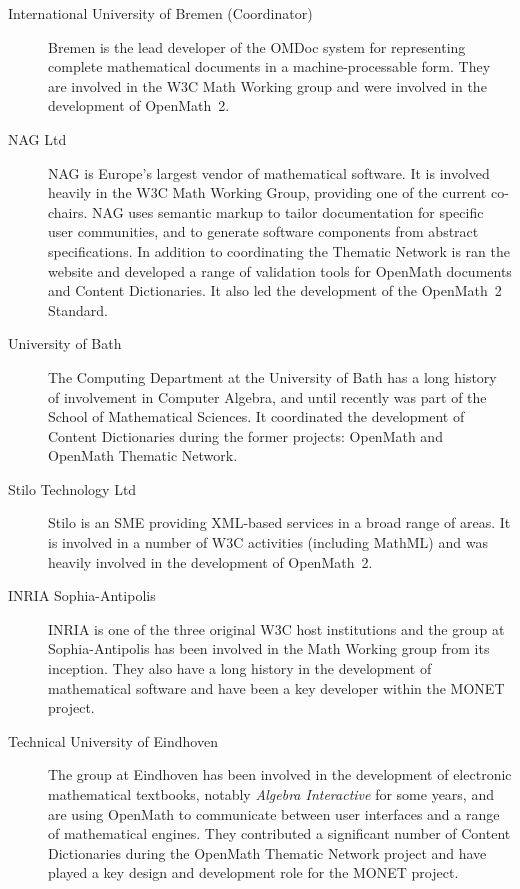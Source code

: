 \documentclass{euproposal}
\begin{document}
\begin{description}
\item[International University of Bremen (Coordinator)] Bremen is the
  lead developer of the OMDoc system for representing complete
  mathematical documents in a machine-processable form.  They are
  involved in the W3C Math Working group and were involved in the
  development of OpenMath~2.
  
\item[NAG Ltd] NAG is Europe's largest vendor of mathematical
  software.  It is involved heavily in the W3C Math Working Group,
  providing one of the current co-chairs.  NAG uses semantic markup to
  tailor documentation for specific user communities, and to generate
  software components from abstract specifications.  In addition to
  coordinating the Thematic Network is ran the website and developed a
  range of validation tools for OpenMath documents and Content
  Dictionaries.  It also led the development of the OpenMath~2
  Standard.
  
\item[University of Bath] The Computing Department at the University
  of Bath has a long history of involvement in Computer Algebra, and
  until recently was part of the School of Mathematical Sciences.  It
  coordinated the development of Content Dictionaries during the
  former projects: OpenMath and OpenMath Thematic Network.
  
\item[Stilo Technology Ltd] Stilo is an SME providing XML-based
  services in a broad range of areas.  It is involved in a number of
  W3C activities (including MathML) and was heavily involved in the
  development of OpenMath~2.
  
\item[INRIA Sophia-Antipolis] INRIA is one of the three original W3C
  host institutions and the group at Sophia-Antipolis has been
  involved in the Math Working group from its inception.  They also
  have a long history in the development of mathematical software and
  have been a key developer within the MONET project.
  
\item[Technical University of Eindhoven] The group at Eindhoven has
  been involved in the development of electronic mathematical
  textbooks, notably \emph{Algebra Interactive} for some years, and
  are using OpenMath to communicate between user interfaces and a
  range of mathematical engines.  They contributed a significant
  number of Content Dictionaries during the OpenMath Thematic Network
  project and have played a key design and development role for the
  MONET project.
  

\end{description}
\end{document}
